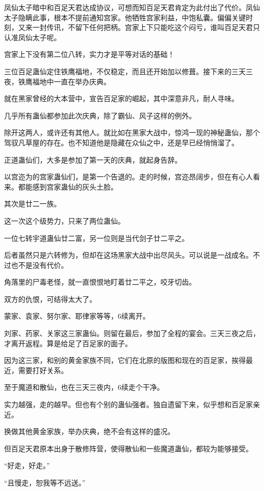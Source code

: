\begin{this_body}
凤仙太子暗中和百足天君达成协议，可想而知百足天君肯定为此付出了代价。凤仙太子隐瞒此事，根本不提前通知宫家。他牺牲宫家利益，中饱私囊。偏偏关键时刻，又来一封传讯，不留下任何把柄。宫家上下只能吃这个闷亏，谁叫百足天君只认准凤仙太子呢。

宫家上下没有第二位八转，实力才是平等对话的基础！

三位百足蛊仙定住铁鹰福地，不仅稳定，而且还开始加以修葺。接下来的三天三夜，铁鹰福地中一直在举办庆典。

就在黑家曾经的大本营中，宣告百足家的崛起，其中深意非凡，耐人寻味。

几乎所有蛊仙都参加此次庆典，除了霸仙、风子这样的例外。

除开这两人，或许还有其他人。就比如在黑家大战中，惊鸿一现的神秘蛊仙，那个驾驭凡草屋的存在。也不知道他是隐藏在众仙之中，还是早已经悄悄溜了。

正道蛊仙们，大多是参加了第一天的庆典，就起身告辞。

以宫迩为的宫家蛊仙们，是第一个告退的。走的时候，宫迩昂阔步，但在有心人看来。都能感到宫家蛊仙的灰头土脸。

其次是廿二一族。

这一次这个级势力，只来了两位蛊仙。

一位七转宇道蛊仙廿二富，另一位则是当代剑子廿二平之。

后者虽然只是六转修为，但却在这场黑家大战中出尽风头。可以说是一战成名。不过也不是没有代价。

角落里的尸毒老怪，就一直恨恨地盯着廿二平之，咬牙切齿。

双方的仇恨，可结得太大了。

蒙家、袁家、努尔家、耶律家等等，6续离开。

刘家、药家、关家这三家蛊仙。则留在最后，参加了全程的宴会。三天三夜之后，才离开返程。算是给足了百足家的面子。

因为这三家，和别的黄金家族不同，它们在北原的版图和现在的百足家，挨得最近，需要打好关系。

至于魔道和散仙，也在三天三夜内，6续走个干净。

实力越强，走的越早。但也有个别的蛊仙强者。独自遗留下来，似乎想和百足家亲近。

换做其他黄金家族，举办庆典，绝不会有这样的盛况。

但百足天君原本出身于散修阵营，使得散仙和一些魔道蛊仙，都较为能够接受。

“好走，好走。”

“且慢走，恕我等不远送。”


\end{this_body}
